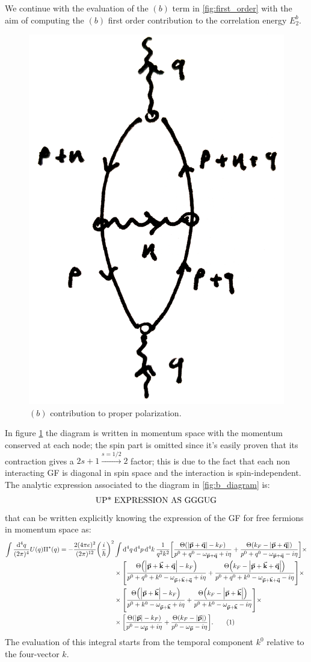 \documentclass[a4paper]{article}
\newcommand{\numberthis}{\addtocounter{equation}{1}\tag{\theequation}}
\newcommand{\Ta}{\Theta\pqty{\abs{\va{p}+\va{q}}-k_F}}
\newcommand{\Taa}{\Theta\pqty{k_F - \abs{\va{p}+\va{q}}}}
\newcommand{\Tb}{\Theta\pqty{\abs{\va{p} + \va{k} + \va{q}}-k_F}}
\newcommand{\Tbb}{\Theta\pqty{k_F - \abs{\va{p} + \va{k} + \va{q}}}}
\newcommand{\Tc}{\Theta\pqty{\abs{\va{p}+\va{k}}-k_F}}
\newcommand{\Tcc}{\Theta\pqty{k_F -\abs{\va{p}+\va{k}}}}
\newcommand{\Td}{\Theta\pqty{\abs{\va{p}}-k_F}}
\newcommand{\Tdd}{\Theta\pqty{k_F -\abs{\va{p}}}}
\begin{document}
We continue with the evaluation of the $(b)$ term in \ref{fig:first_order} with the aim of computing the $(b)$ first order contribution to the correlation energy $E_2^b.$
\begin{figure}[h]
\centering
\includegraphics[width=.3\textwidth]{b_diagram.png}
\caption{$(b)$ contribution to proper polarization.}
\label{fig:b_diagram}
\end{figure}
In figure \ref{fig:b_diagram} the diagram is written in momentum space with the momentum conserved at each node; the spin part is omitted since it's easily proven that its contraction gives a $2s+1 \overset{s=1/2}{\rightarrow} 2 $ factor; this is due to the fact that each non interacting GF is diagonal in spin space and the interaction is spin-independent.
The analytic expression associated to the diagram in \eqref{fig:b_diagram} is:
\begin{align*}
\qq{UP* EXPRESSION AS GGGUG}
\end{align*}
that can be written explicitly knowing the expression of the GF for free fermions in momentum space as:
\begin{align*}
\int \frac{\dd[4]{q}}{(2\pi)^4}U(q)\Pi^*(q) = -\frac{2(4\pi e)^2}{(2\pi)^{12}} \pqty{\frac{i}{\hbar}}^2 &\int \dd[4]{q}\dd[4]{p}\dd[4]{k}\frac{1}{q^2 k^2}
\bqty{\frac{\Ta}{p^0 +q^0 -\omega_{\va{p} + \va{q}} + i\eta} + \frac{\Taa}{p^0+q^0 -\omega_{\va{p}+\va{q}}-i\eta}}\times\\
&\times \bqty{\frac{\Tb}{p^0+q^0+k^0 - \omega_{\va{p}+\va{k}+\va{q}}+i\eta} + \frac{\Tbb}{p^0+q^0+k^0 - \omega_{\va{p}+\va{k}+\va{q}}-i\eta} }\times\\
&\times \bqty{\frac{\Tc}{p^0+k^0 - \omega_{\va{p}+\va{k}}+i\eta} + \frac{\Tcc}{p^0+k^0 - \omega_{\va{p}+\va{k}}-i\eta} }\times\\
&\times \bqty{\frac{\Td}{p^0 - \omega_{\va{p}}+i\eta} + \frac{\Tdd}{p^0 - \omega_{\va{p}}-i\eta} }.\numberthis 
\end{align*}
The evaluation of this integral starts from the temporal component $k^0$ relative to the four-vector $k.$
\end{document}
